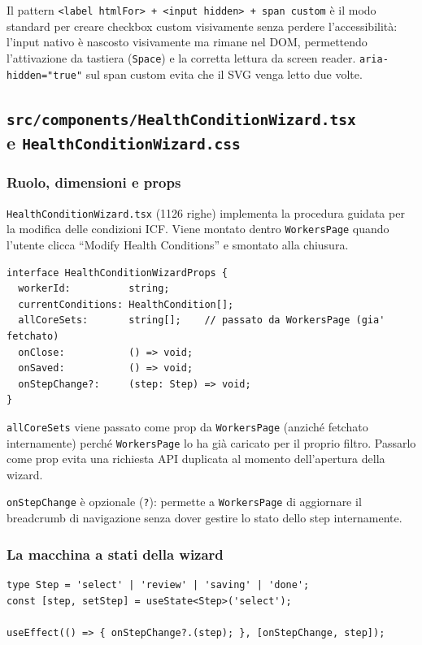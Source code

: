 \documentclass[a4paper,12pt]{article}
\begin{document}
\noindent Il pattern \texttt{<label htmlFor> + <input hidden> + span custom}
\`{e} il modo standard per creare checkbox custom visivamente senza
perdere l'accessibilit\`{a}: l'input nativo \`{e} nascosto visivamente
ma rimane nel DOM, permettendo l'attivazione da tastiera (\texttt{Space})
e la corretta lettura da screen reader. \texttt{aria-hidden="true"}
sul span custom evita che il SVG venga letto due volte.

\subsection[\texttt{src/components/HealthConditionWizard.tsx} e \texttt{HealthConditionWizard.css}]{\texttt{src/components/HealthConditionWizard.tsx}\\[2pt]e \texttt{HealthConditionWizard.css}}

\subsubsection{Ruolo, dimensioni e props}

\texttt{HealthConditionWizard.tsx} (1126 righe) implementa la procedura
guidata per la modifica delle condizioni ICF. Viene montato dentro
\texttt{WorkersPage} quando l'utente clicca ``Modify Health Conditions''
e smontato alla chiusura.

\begin{lstlisting}
interface HealthConditionWizardProps {
  workerId:          string;
  currentConditions: HealthCondition[];
  allCoreSets:       string[];    // passato da WorkersPage (gia' fetchato)
  onClose:           () => void;
  onSaved:           () => void;
  onStepChange?:     (step: Step) => void;
}
\end{lstlisting}

\noindent \texttt{allCoreSets} viene passato come prop da \texttt{WorkersPage}
(anzich\'{e} fetchato internamente) perch\'{e} \texttt{WorkersPage} lo
ha gi\`{a} caricato per il proprio filtro. Passarlo come prop evita
una richiesta API duplicata al momento dell'apertura della wizard.

\texttt{onStepChange} \`{e} opzionale (\texttt{?}): permette a
\texttt{WorkersPage} di aggiornare il breadcrumb di navigazione
senza dover gestire lo stato dello step internamente.

\subsubsection{La macchina a stati della wizard}
\vspace{2pt}
\begin{lstlisting}
type Step = 'select' | 'review' | 'saving' | 'done';
const [step, setStep] = useState<Step>('select');

useEffect(() => { onStepChange?.(step); }, [onStepChange, step]);
\end{lstlisting}
\end{document}
